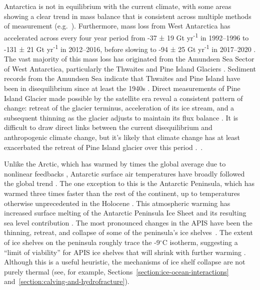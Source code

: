 Antarctica is not in equilibrium with the current climate, with some areas showing a clear trend in mass balance that is consistent across multiple methods of measurement (e.g.~\citealt{gardnerIncreasedWestAntarctic2018,smithPervasiveIceSheet2020,velicognaContinuityIceSheet2020}). Furthermore, mass loss from West Antarctica has accelerated across every four year period from -37 ± 19 Gt yr\textsuperscript{-1} in 1992--1996 to -131 ± 21 Gt yr\textsuperscript{-1} in 2012--2016, before slowing to -94 ± 25 Gt yr\textsuperscript{-1} in 2017--2020 \citep{otosakaMassBalanceGreenland2023a}. The vast majority of this mass loss has originated from the Amundsen Sea Sector of West Antarctica, particularly the Thwaites and Pine Island Glaciers \citep{rignotFourDecadesAntarctic2019}. Sediment records from the Amundsen Sea indicate that Thwaites and Pine Island have been in disequilibrium since at least the 1940s . Direct measurements of Pine Island Glacier made possible by the satellite era reveal a consistent pattern of change: retreat of the glacier terminus, acceleration of its ice stream, and a subsequent thinning as the glacier adjusts to maintain its flux balance \citep{joughinTimingRecentAccelerations2003,payneRecentDramaticThinning2004} . It is difficult to draw direct links between the current disequilibrium and anthropogenic climate change, but it's likely that climate change has at least exacerbated the retreat of Pine Island glacier over this period \citep{bradleyQuantifyingAttributingRole2025}.~.


Unlike the Arctic, which has warmed by  times the global average due to nonlinear feedbacks \citep{previdiArcticAmplificationClimate2021}, Antarctic surface air temperatures have broadly followed the global trend . The one exception to this is the Antarctic Peninsula, which has warmed three times faster than the rest of the continent, up to temperatures otherwise unprecedented in the Holocene \citep{vaughanRecentRapidRegional2003}. This atmospheric warming has increased surface melting of the Antarctic Peninsula Ice Sheet and its resulting sea level contribution \citep{vaughanRecentTrendsMelting2006}. The most pronounced changes in the APIS have been the thinning, retreat, and collapse of some of the peninsula's ice shelves~\citep{cookOverviewArealChanges2010,rignotIceShelfMeltingAntarctica2013}. The extent of ice shelves on the peninsula roughly trace the -9$^\circ$C isotherm, suggesting a ``limit of viability'' for APIS ice shelves that will shrink with further warming \citep{morrisSpatialTemporalVariation2013}. Although this is a useful heuristic, the mechanisms of ice shelf collapse are not purely thermal (see, for example, Sections~\ref{section:ice-ocean-interactions} and~\ref{section:calving-and-hydrofracture}).

